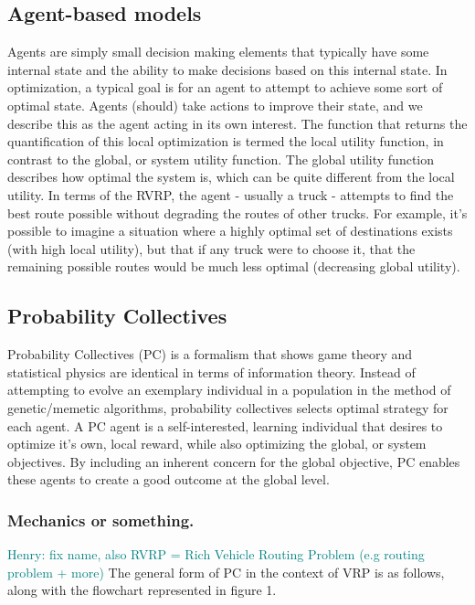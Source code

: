 \documentclass{sig-alternate}
\newcommand{\allcomments}[1]{{#1}}
\newcommand{\hfcomment}[1]{\textcolor{Teal}{\allcomments{Henry: {#1}}}}
\begin{document}
\subsection{Agent-based models}
\label{ssec:agents}
Agents are simply small decision making elements that typically have some internal state and the ability to make decisions based on this internal state. In optimization, a typical goal is for an agent to attempt to achieve some sort of optimal state. Agents (should) take actions to improve their state, and we describe this as the agent acting in its own interest. The function that returns the quantification of this local optimization is termed the local utility function, in contrast to the global, or system utility function. The global utility function describes how optimal the system is, which can be quite different from the local utility. In terms of the RVRP, the agent - usually a truck - attempts to find the best route possible without degrading the routes of other trucks. For example, it's possible to imagine a situation where a highly optimal set of destinations exists (with high local utility), but that if any truck were to choose it, that the remaining possible routes would be much less optimal (decreasing global utility).

\subsection{Probability Collectives}
\label{ssec:PC}
Probability Collectives (PC) is a formalism that shows game theory and statistical physics are identical in terms of information theory. Instead of attempting to evolve an exemplary individual in a population in the method of genetic/memetic algorithms, probability collectives selects optimal strategy for each agent. A PC agent is a self-interested, learning individual that desires to optimize it's own, local reward, while also optimizing the global, or system objectives. By including an inherent concern for the global objective, PC enables these agents to create a good outcome at the global level.

\subsubsection{Mechanics or something.}
\hfcomment{fix name, also RVRP = Rich Vehicle Routing Problem (e.g routing problem + more)}
The general form of PC in the context of VRP is as follows, along with the flowchart represented in figure 1.
\end{document}
